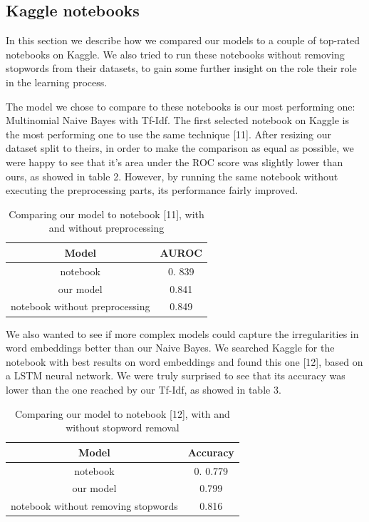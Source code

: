 \subsection*{Kaggle notebooks}

In this section we describe how we compared our models to a couple of top-rated notebooks on Kaggle.  We also tried to run these notebooks without removing stopwords from their datasets, to gain some further insight on the role their role in the learning process. 

The model we chose to compare to these notebooks is our most performing one: Multinomial Naive Bayes with Tf-Idf.  The first selected notebook on Kaggle is the most performing one to use the same technique [11].  After resizing our dataset split to theirs, in order to make the comparison as equal as possible,  we were happy to see that it's area under the ROC score was slightly lower than ours,  as showed in table 2.  However, by running the same notebook without executing the preprocessing parts, its performance fairly improved.

\begin{table}[h!t]
    \centering
    \caption{Comparing our model to notebook [11],  with and without preprocessing}
    \label{tab:versus_metrics}
    \begin{tabular}{c|c}
        \hline
        Model & AUROC \\
        \hline 
        notebook & 0. 839 \\ 
        our model & 0.841 \\ 
        notebook without preprocessing & 0.849 \\ 
        \hline
    \end{tabular}
\end{table}

We also wanted to see if more complex models could capture the irregularities in word embeddings better than our Naive Bayes.  We searched Kaggle for the notebook with best results on word embeddings and found this one [12],  based on a LSTM neural network.  We were truly surprised to see that its accuracy was lower than the one reached by our Tf-Idf,  as showed in table 3. 

\begin{table}[h!t]
    \centering
    \caption{Comparing our model to notebook [12],  with and without stopword removal}
    \label{tab:versus_metrics}
    \begin{tabular}{c|c}
        \hline
        Model & Accuracy\\
        \hline 
        notebook & 0. 0.779 \\ 
        our model & 0.799 \\ 
        notebook without removing stopwords & 0.816 \\ 
        \hline
    \end{tabular}
\end{table}

